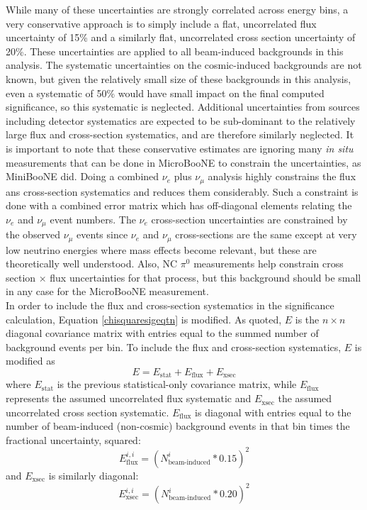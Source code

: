 While many of these uncertainties are strongly correlated across energy bins, a very conservative approach is to simply include a flat, uncorrelated flux uncertainty of 15\% and a similarly flat, uncorrelated cross section uncertainty of 20\%. These uncertainties are applied to all beam-induced backgrounds in this analysis. The systematic uncertainties on the cosmic-induced backgrounds are not known, but given the relatively small size of these backgrounds in this analysis, even a systematic of 50\% would have small impact on the final computed significance, so this systematic is neglected. Additional uncertainties from sources including detector systematics are expected to be sub-dominant to the relatively large flux and cross-section systematics, and are therefore similarly neglected. It is important to note that these conservative estimates are ignoring many \textit{in situ} measurements that can be done in MicroBooNE to constrain the uncertainties, as MiniBooNE did. Doing a combined $\nu_e$ plus $\nu_\mu$ analysis highly constrains the flux ans cross-section systematics and reduces them considerably. Such a constraint is done with a combined error matrix which has off-diagonal elements relating the $\nu_e$ and $\nu_\mu$ event numbers. The $\nu_e$ cross-section uncertainties are constrained by the observed $\nu_\mu$ events since $\nu_e$ and $\nu_\mu$ cross-sections are the same except at very low neutrino energies where mass effects become relevant, but these are theoretically well understood. Also, NC $\pi^0$ measurements help constrain cross section $\times$ flux uncertainties for that process, but this background should be small in any case for the MicroBooNE measurement.\\

In order to include the flux and cross-section systematics in the significance calculation, Equation \ref{chisquaresigeqtn} is modified. As quoted, $E$ is the $n\times n$ diagonal covariance matrix with entries equal to the summed number of background events per bin. To include the flux and cross-section systematics, $E$ is modified as
\begin{equation}\label{LEE_emtx_systematics}
E = E_{\text{stat}} + E_{\text{flux}} + E_{\text{xsec}}
\end{equation}
where $E_{\text{stat}}$ is the previous statistical-only covariance matrix, while $E_{\text{flux}}$ represents the assumed uncorrelated flux systematic and $E_{\text{xsec}}$ the assumed uncorrelated cross section systematic. $E_{\text{flux}}$ is diagonal with entries equal to the number of beam-induced (non-cosmic) background events in that bin times the fractional uncertainty, squared:
\begin{equation}\label{LEE_flux_emtx}
E_{\text{flux}}^{i,i} = (N_{\text{beam-induced}}^i*0.15)^2
\end{equation}
and $E_{\text{xsec}}$ is similarly diagonal:
\begin{equation}\label{LEE_xsec_emtx}
E_{\text{xsec}}^{i,i} = (N_{\text{beam-induced}}^i*0.20)^2
\end{equation}


